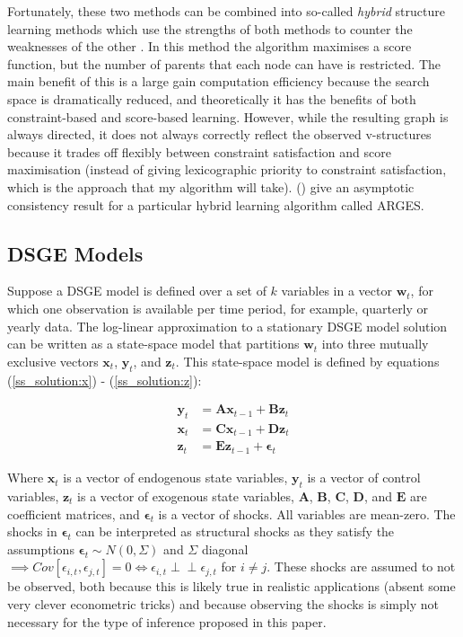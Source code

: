 \documentclass{article}
\def\indep{\perp \!\!\! \perp}
\begin{document}
Fortunately, these two methods can be combined into so-called \textit{hybrid} structure learning methods which use the strengths of both methods to counter the weaknesses of the other \parencite{scutari2014multiple} \parencite{friedman2013learning}. In this method the algorithm maximises a score function, but the number of parents that each node can have is restricted. The main benefit of this is a large gain computation efficiency because the search space is dramatically reduced, and theoretically it has the benefits of both constraint-based and score-based learning. However, while the resulting graph is always directed, it does not always correctly reflect the observed v-structures because it trades off flexibly between constraint satisfaction and score maximisation (instead of giving lexicographic priority to constraint satisfaction, which is the approach that my algorithm will take). \citeauthor{nandy2018high} (\citeyear{nandy2018high}) give an asymptotic consistency result for a particular hybrid learning algorithm called ARGES.

\subsection{DSGE Models} \label{dsge}

Suppose a DSGE model is defined over a set of $k$ variables in a vector $\mathbf{w}_t$, for which one observation is available per time period, for example, quarterly or yearly data. The log-linear approximation to a stationary DSGE model solution can be written as a state-space model \parencite{king1988production} that partitions $\mathbf{w}_t$ into three mutually exclusive vectors $\mathbf{x}_t$, $\mathbf{y}_t$, and $\mathbf{z}_t$. This state-space model is defined by equations (\ref{ss_solution:x}) - (\ref{ss_solution:z}):

\begin{align}
  \mathbf{y}_t &= \mathbf{A} \mathbf{x}_{t-1} + \mathbf{B} \mathbf{z}_{t} \label{ss_solution:x}\\
  \mathbf{x}_t &= \mathbf{C} \mathbf{x}_{t-1} + \mathbf{D} \mathbf{z}_{t} \label{ss_solution:y}\\
  \mathbf{z}_t &= \mathbf{E} \mathbf{z}_{t-1} + \mathbf{\epsilon}_{t} \label{ss_solution:z}
\end{align}

Where $\mathbf{x}_t$ is a vector of endogenous state variables, $\mathbf{y}_t$ is a vector of control variables, $\mathbf{z}_t$ is a vector of exogenous state variables, $\mathbf{A}$, $\mathbf{B}$, $\mathbf{C}$, $\mathbf{D}$, and $\mathbf{E}$ are coefficient matrices, and $\mathbf{\epsilon}_t$ is a vector of shocks. All variables are mean-zero. The shocks in $\mathbf{\epsilon}_t$ can be interpreted as structural shocks as they satisfy the assumptions $\mathbf{\epsilon}_{t} \sim N(0,\Sigma)$ and $\Sigma$ diagonal $\implies Cov[\epsilon_{i,t},\epsilon_{j,t}] = 0 \iff \epsilon_{i,t} \indep \epsilon_{j,t} $ for $i \not = j$. These shocks are assumed to not be observed, both because this is likely true in realistic applications (absent some very clever econometric tricks) and because observing the shocks is simply not necessary for the type of inference proposed in this paper.
\end{document}
